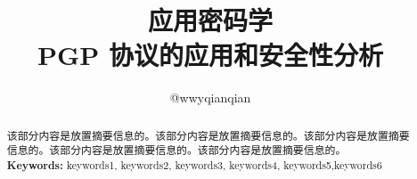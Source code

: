 \documentclass[a4pper]{article}
\title{应用密码学\\ PGP 协议的应用和安全性分析}
\author{@wwyqianqian}
\date{} %
\begin{document}
\maketitle          %
\tableofcontents    %
\clearpage          %


\pagestyle{main}    %

\begin{abstract}
该部分内容是放置摘要信息的。该部分内容是放置摘要信息的。该部分内容是放置摘要信息的。该部分内容是放置摘要信息的。该部分内容是放置摘要信息的。\\
{\bf Keywords:} keywords1, keywords2, keywords3, keywords4, keywords5,keywords6
\end{abstract}
\end{document}
